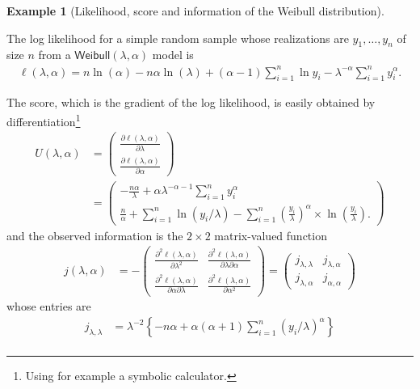 \documentclass[
  11pt,
  letterpaper,
]{scrbook}
\theoremstyle{definition}
\theoremstyle{plain}
\theoremstyle{plain}
\theoremstyle{definition}
\newtheorem{example}{Example}[chapter]
\theoremstyle{definition}
\theoremstyle{remark}
\begin{document}
\begin{example}[Likelihood, score and information of the Weibull
distribution]\protect\hypertarget{exm-weibull-info}{}\label{exm-weibull-info}

The log likelihood for a simple random sample whose realizations are
\(y_1, \ldots, y_n\) of size \(n\) from a
\(\mathsf{Weibull}(\lambda, \alpha)\) model is \begin{align*}
\ell(\lambda, \alpha) = n \ln(\alpha) - n\alpha\ln(\lambda) + (\alpha-1) \sum_{i=1}^n \ln y_i  - \lambda^{-\alpha}\sum_{i=1}^n y_i^\alpha.
\end{align*}

The score, which is the gradient of the log likelihood, is easily
obtained by differentiation\footnote{Using for example a symbolic
  calculator.} \begin{align*}
U(\lambda, \alpha) &= \begin{pmatrix}\frac{\partial \ell(\lambda, \alpha)}{\partial \lambda} \\
\frac{\partial \ell(\lambda, \alpha)}{\partial \alpha} \end{pmatrix} \\&=
\begin{pmatrix}
 -\frac{n\alpha}{\lambda} +\alpha\lambda^{-\alpha-1}\sum_{i=1}^n y_i^\alpha
 \\
 \frac{n}{\alpha} + \sum_{i=1}^n \ln (y_i/\lambda)  - \sum_{i=1}^n \left(\frac{y_i}{\lambda}\right)^{\alpha} \times\ln\left(\frac{y_i}{\lambda}\right).
 \end{pmatrix}
\end{align*} and the observed information is the \(2 \times 2\)
matrix-valued function \begin{align*}
j(\lambda, \alpha) &= - \begin{pmatrix}
\frac{\partial^2 \ell(\lambda, \alpha)}{\partial \lambda^2} &  \frac{\partial^2 \ell(\lambda, \alpha)}{\partial \lambda \partial \alpha} \\ \frac{\partial^2 \ell(\lambda, \alpha)}{\partial \alpha \partial \lambda} & \frac{\partial^2 \ell(\lambda, \alpha)}{\partial \alpha^2}
\end{pmatrix}  = \begin{pmatrix} j_{\lambda, \lambda} & j_{\lambda, \alpha} \\ j_{\lambda, \alpha} & j_{\alpha, \alpha} \end{pmatrix}
\end{align*} whose entries are \begin{align*}
j_{\lambda, \lambda} &= \lambda^{-2}\left\{-n\alpha + \alpha(\alpha+1)\sum_{i=1}^n (y_i/\lambda)^\alpha\right\} \\

\end{align*}
\end{example}
\end{document}
